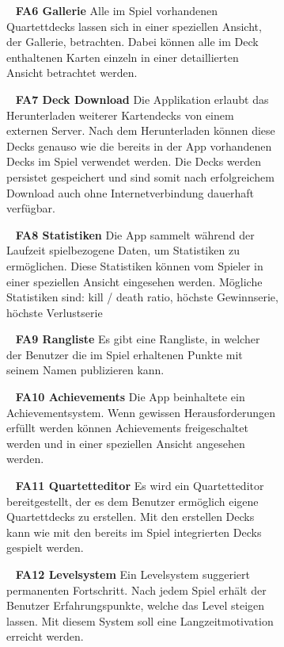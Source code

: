 \documentclass{scrartcl}
\begin{document}
\begin{figure}[!ht]
\begin{figure}[!ht]
\ \newline
\textbf{FA6 Gallerie} \newline
Alle im Spiel vorhandenen Quartettdecks lassen sich in einer speziellen Ansicht,
der Gallerie, betrachten. Dabei können alle im Deck enthaltenen Karten einzeln
in einer detaillierten Ansicht betrachtet werden.

\ \newline
\textbf{FA7 Deck Download} \newline
Die Applikation erlaubt das Herunterladen weiterer Kartendecks von einem
externen Server. Nach dem Herunterladen können diese Decks genauso wie die
bereits in der App vorhandenen Decks im Spiel verwendet werden. Die Decks werden
persistet gespeichert und sind somit nach erfolgreichem Download auch ohne
Internetverbindung dauerhaft verfügbar.

\ \newline
\textbf{FA8 Statistiken} \newline
Die App sammelt während der Laufzeit spielbezogene Daten, um Statistiken zu
ermöglichen. Diese Statistiken können vom Spieler in einer speziellen Ansicht
eingesehen werden. Mögliche Statistiken sind: kill / death ratio, höchste
Gewinnserie, höchste Verlustserie

\ \newline
\textbf{FA9 Rangliste} \newline
Es gibt eine Rangliste, in welcher der Benutzer die im Spiel erhaltenen Punkte
mit seinem Namen publizieren kann.

\ \newline
\textbf{FA10 Achievements} \newline
Die App beinhaltete ein Achievementsystem. Wenn gewissen Herausforderungen
erfüllt werden können Achievements freigeschaltet werden und in einer speziellen
Ansicht angesehen werden.

\ \newline
\textbf{FA11 Quartetteditor} \newline
Es wird ein Quartetteditor bereitgestellt, der es dem Benutzer ermöglich
eigene Quartettdecks zu erstellen. Mit den erstellen Decks kann wie mit den
bereits im Spiel integrierten Decks gespielt werden.

\ \newline
\textbf{FA12 Levelsystem} \newline
Ein Levelsystem suggeriert permanenten Fortschritt. Nach jedem Spiel erhält der
Benutzer Erfahrungspunkte, welche das Level steigen lassen. Mit diesem System
soll eine Langzeitmotivation erreicht werden.


\end{figure}
\end{figure}
\end{document}
